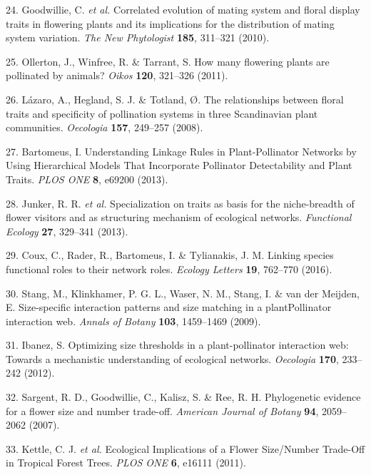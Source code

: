 \documentclass[12pt,a4paper,]{article}
\begin{document}
\hypertarget{ref-goodwillie2010}{}
24. Goodwillie, C. \emph{et al.} Correlated evolution of mating system
and floral display traits in flowering plants and its implications for
the distribution of mating system variation. \emph{The New Phytologist}
\textbf{185}, 311--321 (2010).

\hypertarget{ref-ollerton2011}{}
25. Ollerton, J., Winfree, R. \& Tarrant, S. How many flowering plants
are pollinated by animals? \emph{Oikos} \textbf{120}, 321--326 (2011).

\hypertarget{ref-lazaro2008}{}
26. Lázaro, A., Hegland, S. J. \& Totland, Ø. The relationships between
floral traits and specificity of pollination systems in three
Scandinavian plant communities. \emph{Oecologia} \textbf{157}, 249--257
(2008).

\hypertarget{ref-bartomeus2013}{}
27. Bartomeus, I. Understanding Linkage Rules in Plant-Pollinator
Networks by Using Hierarchical Models That Incorporate Pollinator
Detectability and Plant Traits. \emph{PLOS ONE} \textbf{8}, e69200
(2013).

\hypertarget{ref-junker2013}{}
28. Junker, R. R. \emph{et al.} Specialization on traits as basis for
the niche-breadth of flower visitors and as structuring mechanism of
ecological networks. \emph{Functional Ecology} \textbf{27}, 329--341
(2013).

\hypertarget{ref-coux2016}{}
29. Coux, C., Rader, R., Bartomeus, I. \& Tylianakis, J. M. Linking
species functional roles to their network roles. \emph{Ecology Letters}
\textbf{19}, 762--770 (2016).

\hypertarget{ref-stang2009}{}
30. Stang, M., Klinkhamer, P. G. L., Waser, N. M., Stang, I. \& van der
Meijden, E. Size-specific interaction patterns and size matching in a
plantPollinator interaction web. \emph{Annals of Botany} \textbf{103},
1459--1469 (2009).

\hypertarget{ref-ibanez2012}{}
31. Ibanez, S. Optimizing size thresholds in a plant-pollinator
interaction web: Towards a mechanistic understanding of ecological
networks. \emph{Oecologia} \textbf{170}, 233--242 (2012).

\hypertarget{ref-sargent2007}{}
32. Sargent, R. D., Goodwillie, C., Kalisz, S. \& Ree, R. H.
Phylogenetic evidence for a flower size and number trade-off.
\emph{American Journal of Botany} \textbf{94}, 2059--2062 (2007).

\hypertarget{ref-kettle2011}{}
33. Kettle, C. J. \emph{et al.} Ecological Implications of a Flower
Size/Number Trade-Off in Tropical Forest Trees. \emph{PLOS ONE}
\textbf{6}, e16111 (2011).
\end{document}
